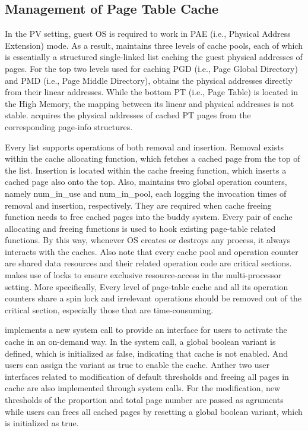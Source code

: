 \subsection{Management of Page Table Cache}

In the PV setting, guest OS is required to work in PAE (i.e., Physical Address Extension) mode. As a result, \name maintains three levels of cache pools, each of which is essentially a structured single-linked list caching the guest physical addresses of pages. For the top two levels used for caching PGD (i.e., Page Global Directory) and PMD (i.e., Page Middle Directory), \name obtains the physical addresses directly from their linear addresses. While the bottom PT (i.e., Page Table) is located in the High Memory, the mapping between its linear and physical addresses is not stable. \name acquires the physical addresses of cached PT pages from the corresponding page-info structures.

Every list supports operations of both removal and insertion. Removal exists within the cache allocating function, which fetches a cached page from the top of the list. Insertion is located within the cache freeing function, which inserts a cached page also onto the top. Also, \name maintains two global operation counters, namely num\_in\_use and num\_in\_pool, each logging the invocation times of removal and insertion, respectively. They are required when cache freeing function needs to free cached pages into the buddy system. Every pair of cache allocating and freeing functions is used to hook existing page-table related functions. By this way, whenever OS creates or destroys any process, it always interacts with the caches. Also note that every cache pool and operation counter are shared data resources and their related operation code are critical sections. \name makes use of locks to ensure exclusive resource-access in the multi-processor setting. More specifically, Every level of page-table cache and all its operation counters share a spin lock and irrelevant operations should be removed out of the critical section, especially those that are time-consuming.

\name implements a new system call to provide an interface for users to activate the cache in an on-demand way. In the system call, a global boolean variant is defined, which is initialized as false, indicating that cache is not enabled. And users can assign the variant as true to enable the cache. Anther two user interfaces related to modification of default thresholds and freeing all pages in cache are also implemented through system calls. For the modification, new thresholds of the proportion and total page number are passed as agruments while users can frees all cached pages by resetting a global boolean variant, which is initialized as true.

